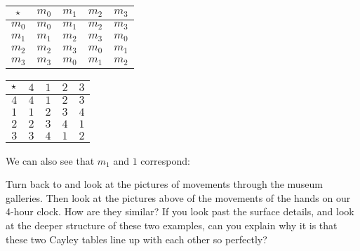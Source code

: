 \documentclass[../../../main.tex]{subfiles}
\begin{document}
\begin{center}
  \begin{tabular}{| c || c | c | c | c |}
    \hline
    $\opSymbol/$ & \cellcolor{grey3} $m_{0}$ & $m_{1}$ & $m_{2}$ & $m_{3}$ \\ \hline \hline
    \cellcolor{grey3} $m_{0}$      & \cellcolor{grey3} $m_{0}$ & $m_{1}$ & $m_{2}$ & $m_{3}$ \\ \hline
    $m_{1}$      & $m_{1}$ & $m_{2}$ & $m_{3}$ & \cellcolor{grey3} $m_{0}$ \\ \hline
    $m_{2}$      & $m_{2}$ & $m_{3}$ & \cellcolor{grey3} $m_{0}$ & $m_{1}$ \\ \hline
    $m_{3}$      & $m_{3}$ & \cellcolor{grey3} $m_{0}$ & $m_{1}$ & $m_{2}$ \\ \hline
  \end{tabular}
  \hskip 2cm
  \begin{tabular}{| c || c | c | c | c |}
    \hline
    $\opSymbol/$ & \cellcolor{grey3} $4$ & $1$ & $2$ & $3$ \\ \hline \hline
    \cellcolor{grey3} $4$          & \cellcolor{grey3} $4$ & $1$ & $2$ & $3$ \\ \hline
    $1$          & $1$ & $2$ & $3$ & \cellcolor{grey3} $4$ \\ \hline
    $2$          & $2$ & $3$ & \cellcolor{grey3} $4$ & $1$ \\ \hline
    $3$          & $3$ & \cellcolor{grey3} $4$ & $1$ & $2$ \\ \hline
  \end{tabular}
\end{center}

We can also see that $m_{1}$ and $1$ correspond:

\begin{ponder}
  Turn back to  and look at the pictures of movements through the museum galleries. Then look at the pictures above of the movements of the hands on our 4-hour clock. How are they similar? If you look past the surface details, and look at the deeper structure of these two examples, can you explain why it is that these two Cayley tables line up with each other so perfectly?
\end{ponder}
\end{document}
